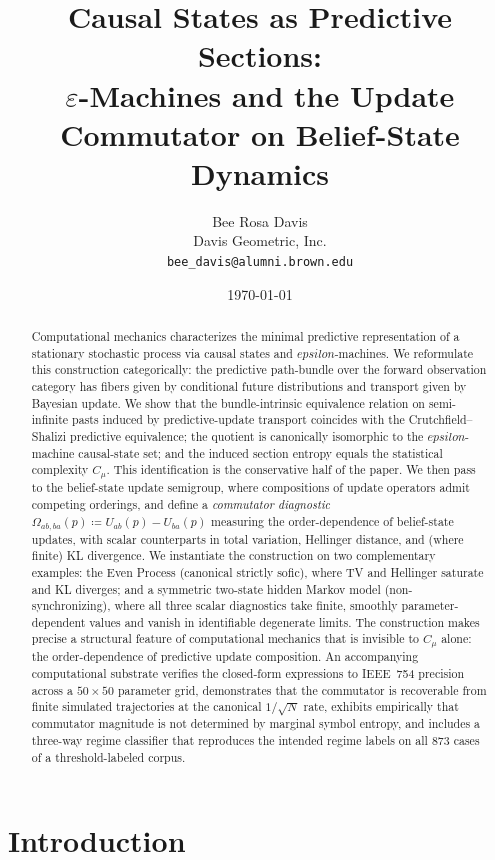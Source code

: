 \documentclass[11pt,a4paper]{article}
\title{Causal States as Predictive Sections:\\
$\varepsilon$-Machines and the Update Commutator on Belief-State Dynamics}
\author{Bee Rosa Davis\\
{\small Davis Geometric, Inc.}\\
{\small \texttt{bee\_davis@alumni.brown.edu}}}
\date{\today}
\def\varepsilon{epsilon}%
\theoremstyle{plain}
\theoremstyle{definition}
\theoremstyle{remark}
\begin{document}
\maketitle

\begin{abstract}
Computational mechanics characterizes the minimal predictive representation of a stationary stochastic process via causal states and $\varepsilon$-machines. We reformulate this construction categorically: the predictive path-bundle over the forward observation category has fibers given by conditional future distributions and transport given by Bayesian update. We show that the bundle-intrinsic equivalence relation on semi-infinite pasts induced by predictive-update transport coincides with the Crutchfield--Shalizi predictive equivalence; the quotient is canonically isomorphic to the $\varepsilon$-machine causal-state set; and the induced section entropy equals the statistical complexity $C_\mu$. This identification is the conservative half of the paper. We then pass to the belief-state update semigroup, where compositions of update operators admit competing orderings, and define a \emph{commutator diagnostic} $\Omega_{ab,ba}(p) \coloneqq U_{ab}(p) - U_{ba}(p)$ measuring the order-dependence of belief-state updates, with scalar counterparts in total variation, Hellinger distance, and (where finite) KL divergence. We instantiate the construction on two complementary examples: the Even Process (canonical strictly sofic), where TV and Hellinger saturate and KL diverges; and a symmetric two-state hidden Markov model (non-synchronizing), where all three scalar diagnostics take finite, smoothly parameter-dependent values and vanish in identifiable degenerate limits. The construction makes precise a structural feature of computational mechanics that is invisible to $C_\mu$ alone: the order-dependence of predictive update composition. An accompanying computational substrate verifies the closed-form expressions to IEEE~754 precision across a $50 \times 50$ parameter grid, demonstrates that the commutator is recoverable from finite simulated trajectories at the canonical $1/\sqrt{N}$ rate, exhibits empirically that commutator magnitude is not determined by marginal symbol entropy, and includes a three-way regime classifier that reproduces the intended regime labels on all $873$ cases of a threshold-labeled corpus.
\end{abstract}

\section{Introduction}
\label{sec:intro}
\end{document}
